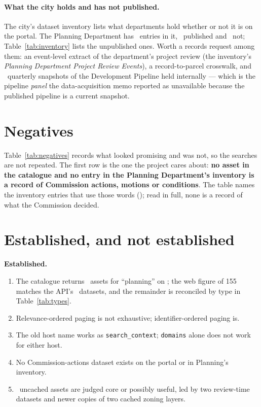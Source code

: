 \documentclass[11pt]{article}
\begin{document}
\paragraph{What the city holds and has not published.} The city's dataset inventory lists
what departments hold whether or not it is on the portal. The Planning Department has
\catInvPlanning\ entries in it, \catInvPublished\ published and \catInvUnpublished\ not;
Table~\ref{tab:inventory} lists the unpublished ones. Worth a records request among them:
an event-level extract of the department's project review (the inventory's
\emph{Planning Department Project Review Events}), a record-to-parcel crosswalk, and
\catInvPipelineInternal\ quarterly snapshots of the Development Pipeline held internally ---
which is the pipeline \emph{panel} the data-acquisition memo reported as unavailable because
the published pipeline is a current snapshot.

\section{Negatives}

Table~\ref{tab:negatives} records what looked promising and was not, so the searches are
not repeated. The first row is the one the project cares about: \textbf{no asset in the
catalogue and no entry in the Planning Department's inventory is a record of Commission
actions, motions or conditions}. The table names the inventory entries that use those words
(\catInvCommission); read in full, none is a record of what the Commission decided.

\section{Established, and not established}

\textbf{Established.}
\begin{enumerate}
\item The catalogue returns \catTotal\ assets for ``planning'' on \catRetrieved; the web
figure of 155 matches the API's \catDatasets\ datasets, and the remainder is reconciled by
type in Table~\ref{tab:types}.
\item Relevance-ordered paging is not exhaustive; identifier-ordered paging is.
\item The old host name works as \texttt{search\_context}; \texttt{domains} alone does not
work for either host.
\item No Commission-actions dataset exists on the portal or in Planning's inventory.
\item \catPossibleNotCached\ uncached assets are judged core or possibly useful, led by two
review-time datasets and newer copies of two cached zoning layers.
\end{enumerate}
\end{document}
